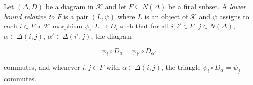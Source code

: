 Let $(\Delta, D)$ be a diagram in $\mathcal{K}$ and let $F \subseteq N(\Delta)$ be a final subset. A \emph{lower bound relative to $F$} is a pair $(L, \psi)$ where $L$ is an object of $\mathcal{K}$ and $\psi$ assigns to each $i \in F$ a $\mathcal{K}$-morphism $\psi_i: L \longrightarrow D_i$ such that for all $i, i' \in F$, $j \in N(\Delta)$, $\alpha \in \Delta(i, j)$, $\alpha' \in \Delta(i', j)$, the diagram

$$\psi_i \circ D_\alpha = \psi_{i'} \circ D_{\alpha'}$$

commutes, and whenever $i, j \in F$ with $\alpha \in \Delta(i, j)$, the triangle $\psi_i \circ D_\alpha = \psi_j$ commutes.
